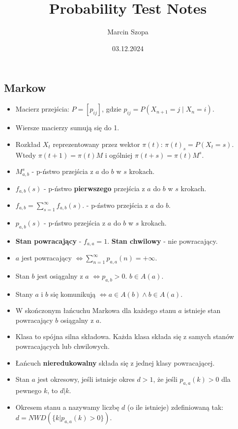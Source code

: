 \documentclass{article}
\title{Probability Test Notes}
\author{Marcin Szopa}
\date{03.12.2024}
\theoremstyle{definition}
\theoremstyle{remark}
\begin{document}
\begin{multicols}{2}
    \section*{Markow}
    \begin{itemize}[itemsep=0pt, left=0pt]
        \item Macierz przejścia: \( P = [p_{ij}] \), gdzie \( p_{ij} = P(X_{n+1} = j \mid X_n = i) \).
        \item Wiersze macierzy sumują się do 1.
        \item Rozkład \(X_t\) reprezentowany przez wektor \(\pi(t)\): \(\pi(t)_s = P(X_t = s)\). Wtedy \(\pi(t + 1) = \pi(t)M\) i ogólniej \(\pi(t + s) = \pi(t)M^s\).
        \item \(M_{a,b}^{s}\) - p-ństwo przejścia z \(a\) do \(b\) w \(s\) krokach.
        \item \(f_{a,b}(s)\) - p-ństwo \textbf{pierwszego} przejścia z \(a\) do \(b\) w \(s\) krokach.
        \item \(f_{a,b} = \sum_{s=1}^{\infty} f_{a,b}(s)\). - p-ństwo przejścia z \(a\) do \(b\).
        \item \(p_{a,b}(s)\) - p-ństwo przejścia z \(a\) do \(b\) w \(s\) krokach.
        \item \textbf{Stan powracający} - \(f_{a,a} = 1\). \textbf{Stan chwilowy} - nie powracający.
        \item \(a\) jest powracający \(\iff \sum_{n=1}^{\infty} p_{a,a}(n) = +\infty\).
        \item Stan \(b\) jest osiągalny z \(a\) \(\iff p_{a,b} > 0\). \(b \in A(a)\).
        \item Stany \(a\) i \(b\) się komunikują \(\iff a \in A(b) \land b \in A(a)\).
        \item W skończonym łańcuchu Markowa dla każdego stanu \(a\) istnieje stan powracający \(b\) osiągalny z \(a\).
        \item Klasa to spójna silna składowa. Każda klasa składa się z samych stanów powracających lub chwilowych.
        \item Łańcuch \textbf{nieredukowalny} składa się z jednej klasy powracającej.
        \item Stan \(a\) jest okresowy, jeśli istnieje okres \(d > 1\), że jeśli \(p_{a,a}(k) > 0\)
         dla pewnego \(k\), to \(d | k\).
        \item Okresem stanu a nazywamy liczbę \(d\) (o ile istnieje) zdefiniowaną tak: \(d = NWD(\{k | p_{a,a}(k) > 0\})\).

\end{itemize}
\end{multicols}
\end{document}
